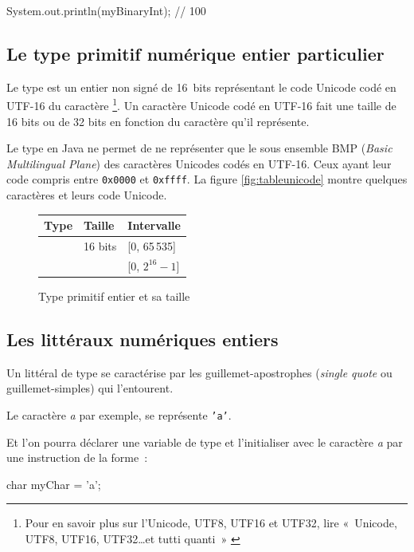 \begin{java}
	System.out.println(myBinaryInt); // 100
\end{java}

\subsection{Le type primitif numérique entier particulier }

Le type  est un entier non signé de 16~bits représentant le code 
Unicode codé en UTF-16 du caractère
	\footnote{%
		Pour en savoir plus sur l'Unicode, UTF8, UTF16 et UTF32, lire
		«~Unicode, UTF8, UTF16, UTF32\ldots et tutti quanti~» \cite{pbt-unicode}
	}. 
Un caractère Unicode codé en UTF-16 fait une taille de 16 bits ou de 32 bits en
fonction du caractère qu'il représente. 

Le type  en Java ne permet de
ne représenter que le sous ensemble BMP (\textit{Basic Multilingual Plane}) des
caractères Unicodes codés en UTF-16. Ceux ayant leur code compris entre
\texttt{0x0000} et \texttt{0xffff}. La figure 
\vref{fig:tableunicode} montre quelques caractères et leurs code Unicode. 

\begin{figure}[h]
	\centering
	\begin{tabular}[h]{|l|l|p{9cm}|}
		\hline
		\rowcolor{black!20}
		\textbf{Type}	&	\textbf{Taille}	&	\textbf{Intervalle}	\\
		\hline
		\pc{char}	&	16 bits	&	[0, 65\,535]\\
		&			&	[$0$, $2^{16}-1$]\\
		\hline
	\end{tabular}	
	\caption{Type primitif entier  et sa taille}
	\label{fig:typeschar}
\end{figure}


\subsection{Les littéraux numériques entiers }

Un littéral de type  se caractérise par les guillemet-apostrophes
(\textit{single quote} ou guillemet-simples) qui l'entourent. 

Le caractère \textit{a} par exemple, se représente \texttt{'a'}. 

Et l'on pourra
déclarer une variable de type  et l'initialiser avec le caractère
\textit{a} par une instruction de la forme~:
\nopagebreak
\begin{java}
	char myChar = 'a';
\end{java}

